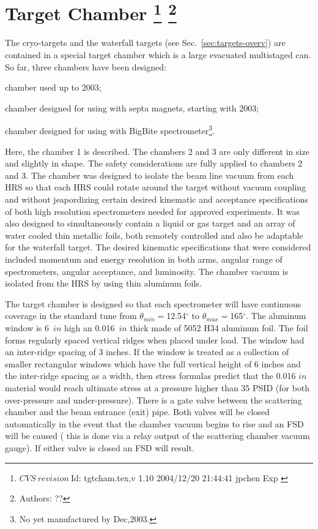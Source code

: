 \chapter[Target Chamber]{Target Chamber
\label{sec:target_chamb}
\footnote{
  $CVS~revision~ $Id: tgtcham.tex,v 1.10 2004/12/20 21:44:41 jpchen Exp $ $
}
\footnote{Authors: ?? }
}

The cryo-targets and the waterfall targets 
(see Sec.~\ref{sec:targets-overv}) 
are contained in a special target chamber which is a large 
evacuated  multistaged can. So far, three chambers have been designed:
\begin{list}{.~}{\setlength{\itemsep}{-0.15cm}}
  \item chamber used up to 2003;
  \item chamber designed for using with septa magnets, starting with 2003;
  \item chamber designed for using with BigBite spectrometer\footnote{
        No yet manufactured by Dec,2003.}.
\end{list}

Here, the chamber 1 is described. The chambers 2 and 3 are only different in 
size and slightly in shape. The safety considerations are fully applied to chambers 2 and 3.
The chamber was designed to isolate the beam line vacuum from  each
HRS so that each HRS could rotate
around the target without vacuum coupling and without jeapordizing
certain desired kinematic and acceptance  specifications of 
both high resolution spectrometers
needed for approved experiments.  It  was also designed to simultaneously
 contain a liquid or gas target and an array of water cooled thin
 metallic foils, both remotely controlled and also be adaptable for
the waterfall target. The desired kinematic specifications that were
 considered included momentum and energy resolution in both arms,
 angular range of spectrometers, angular acceptance, and luminosity.
The chamber vacuum is isolated from the  HRS by using thin aluminum foils. 

The target chamber is designed so that
each spectrometer will have continuous coverage in the standard tune from
$\theta_{min}=$12.54$^\circ$ to $\theta_{max}=$165$^\circ$.
The aluminum window is 6~$in$ high an 0.016~$in$ thick made of 5052 H34 aluminum foil.
The foil forms regularly spaced vertical ridges when
placed under load. The window had an inter-ridge
spacing of 3 inches.
If the window is treated as a collection
of smaller rectangular windows which have the full vertical height
of 6 inches and the inter-ridge spacing as a width,
then stress formulas predict that the 0.016 $in$
material would reach ultimate stress at a pressure higher than 35 PSID
(for both over-pressure and under-pressure). 
There is a gate valve between the 
scattering chamber and the beam entrance (exit) 
pipe. Both 
valves will be closed automatically in the
event that the chamber vacuum begins to rise and an FSD will be caused
( this is done via a relay output of the scattering
chamber vacuum gauge). If either valve is closed an FSD will result.

